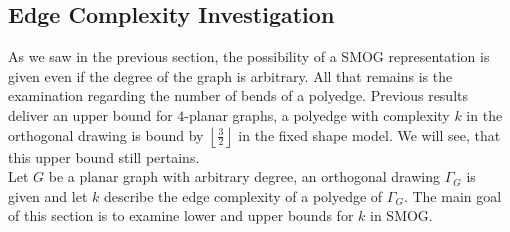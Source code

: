\subsection{Edge Complexity Investigation}
As we saw in the previous section, the possibility of a SMOG representation is given even if the degree of the graph is arbitrary. All that remains is the examination regarding the number of bends of a polyedge. Previous results deliver an upper bound for $4$-planar graphs, a polyedge with complexity $k$ in the orthogonal drawing is bound by $\left\lfloor\frac{3}{2}\right\rfloor$ in the fixed shape model. We will see, that this upper bound still pertains.\\
Let $G$ be a planar graph with arbitrary degree, an orthogonal drawing $\Gamma_G$ is given and let $k$ describe the edge complexity of a polyedge of $\Gamma_G$. The main goal of this section is to examine lower and upper bounds for $k$ in SMOG.
